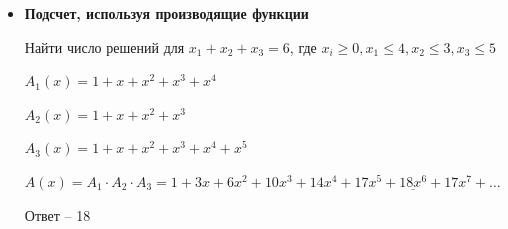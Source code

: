 \documentclass[12pt]{article}
\begin{document}
\begin{itemize}
        $(1 - x)A = 1 + 2x + 2x^2 + 2x^3 + \dots$

        $(1 - x)A = 1 + \frac{2x}{1 - x} \quad A = \frac{1 + \frac{2x}{1 - x}}{1 - x} = \frac{1 + x}{(1 - x)^2}$

        \Ex Найти ПФ для $(1, 4, 9, 16, \dots)$

        $A = 1 + 4x + 9x^2 + 16x^3 + \dots \quad (1 - x)A = $

        \item \textbf{Подсчет, используя производящие функции}

        Найти число решений для $x_1 + x_2 + x_3 = 6$, где $x_i \geq 0, x_1 \leq 4, x_2 \leq 3, x_3 \leq 5$

        $A_1(x) = 1 + x + x^2 + x^3 + x^4$

        $A_2(x) = 1 + x + x^2 + x^3$

        $A_3(x) = 1 + x + x^2 + x^3 + x^4 + x^5$

        $A(x) = A_1 \cdot A_2 \cdot A_3 = 1 + 3x + 6x^2 + 10x^3 + 14x^4 + 17x^5 + \underline{18x^6} + 17x^7 + \dots$

        Ответ -- 18

    \end{itemize}
\end{document}
